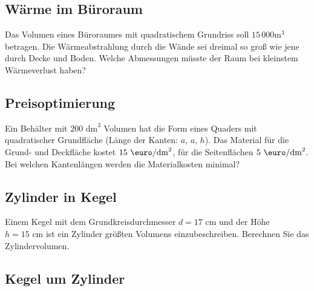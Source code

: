 \subsection{Wärme im Büroraum}

Das Volumen eines Büroraumes mit quadratischem Grundriss soll $15\,000 \text{m}^3$ betragen. Die Wärmeabstrahlung durch die Wände sei dreimal so groß wie jene durch Decke und Boden. Welche Abmessungen müsste der Raum bei kleinstem Wärmeverlust haben?



\subsection{Preisoptimierung}

Ein Behälter mit $200 \text{ dm}^3$ Volumen hat die
Form eines Quaders mit quadratischer Grundfläche (Länge der Kanten: $a$, $a$, $h$). Das Material für die Grund-
und Deckfläche kostet $15 \text{ \euro} / \text{dm}^2$, für die Seitenflächen
$5 \text{ \euro} / \text{dm}^2$. Bei welchen Kantenlängen werden die Materialkosten minimal?






\subsection{Zylinder in Kegel}
Einem Kegel mit dem Grundkreisdurchmesser $d = 17 \text{ cm}$ und der Höhe $h
= 15 \text{ cm}$ ist ein Zylinder größten Volumens einzubeschreiben. Berechnen Sie das Zylindervolumen.


\subsection{Kegel um Zylinder}

